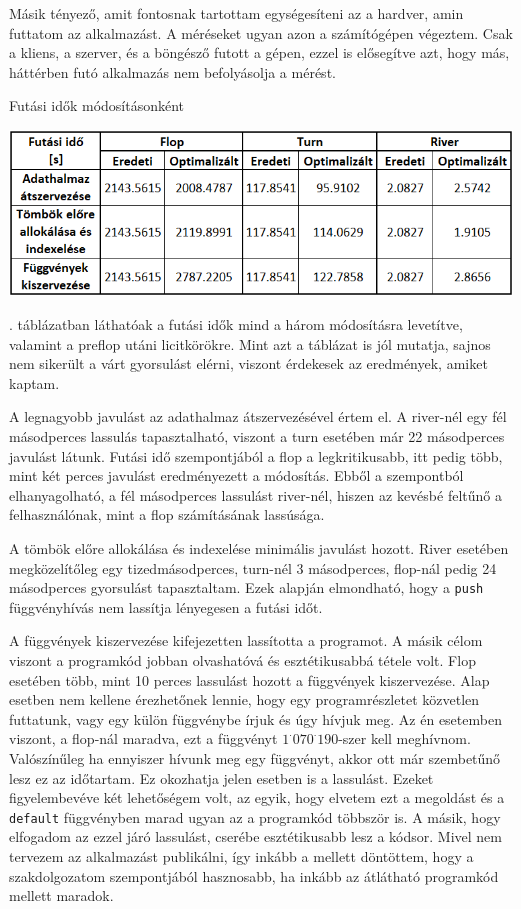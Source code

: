 Másik tényező, amit fontosnak tartottam egységesíteni az a hardver, amin futtatom az alkalmazást. A méréseket ugyan azon a számítógépen végeztem. Csak a kliens, a szerver, és a böngésző futott a gépen, ezzel is elősegítve azt, hogy más, háttérben futó alkalmazás nem befolyásolja a mérést. 

\begin{table}[h]
\centering
\caption{Futási idők módosításonként}
\label{tab:running-time}
\medskip
\includegraphics[width=\textwidth]{images/running-time.png}
\end{table}

. táblázatban láthatóak a futási idők mind a három módosításra levetítve, valamint a preflop utáni licitkörökre. Mint azt a táblázat is jól mutatja, sajnos nem sikerült a várt gyorsulást elérni, viszont érdekesek az eredmények, amiket kaptam.

A legnagyobb javulást az adathalmaz átszervezésével értem el. A river-nél egy fél másodperces lassulás tapasztalható, viszont a turn esetében már 22 másodperces javulást látunk. Futási idő szempontjából a flop a legkritikusabb, itt pedig több, mint két perces javulást eredményezett a módosítás. Ebből a szempontból elhanyagolható, a fél másodperces lassulást river-nél, hiszen az kevésbé feltűnő a felhasználónak, mint a flop számításának lassúsága.

A tömbök előre allokálása és indexelése minimális javulást hozott. River esetében megközelítőleg egy tizedmásodperces, turn-nél 3 másodperces, flop-nál pedig 24 másodperces gyorsulást tapasztaltam. Ezek alapján elmondható, hogy a \texttt{push} függvényhívás nem lassítja lényegesen a futási időt.

A függvények kiszervezése kifejezetten lassította a programot. A másik célom viszont a programkód jobban olvashatóvá és esztétikusabbá tétele volt. Flop esetében több, mint 10 perces lassulást hozott a függvények kiszervezése. Alap esetben nem kellene érezhetőnek lennie, hogy egy programrészletet közvetlen futtatunk, vagy egy külön függvénybe írjuk és úgy hívjuk meg. Az én esetemben viszont, a flop-nál maradva, ezt a függvényt $1^{\cdot}070^{\cdot}190$-szer kell meghívnom. Valószínűleg ha ennyiszer hívunk meg egy függvényt, akkor ott már szembetűnő lesz ez az időtartam. Ez okozhatja jelen esetben is a lassulást. Ezeket figyelembevéve két lehetőségem volt, az egyik, hogy elvetem ezt a megoldást és a \texttt{default} függvényben marad ugyan az a programkód többször is. A másik, hogy elfogadom az ezzel járó lassulást, cserébe esztétikusabb lesz a kódsor. Mivel nem tervezem az alkalmazást publikálni, így inkább a mellett döntöttem, hogy a szakdolgozatom szempontjából hasznosabb, ha inkább az átlátható programkód mellett maradok.

